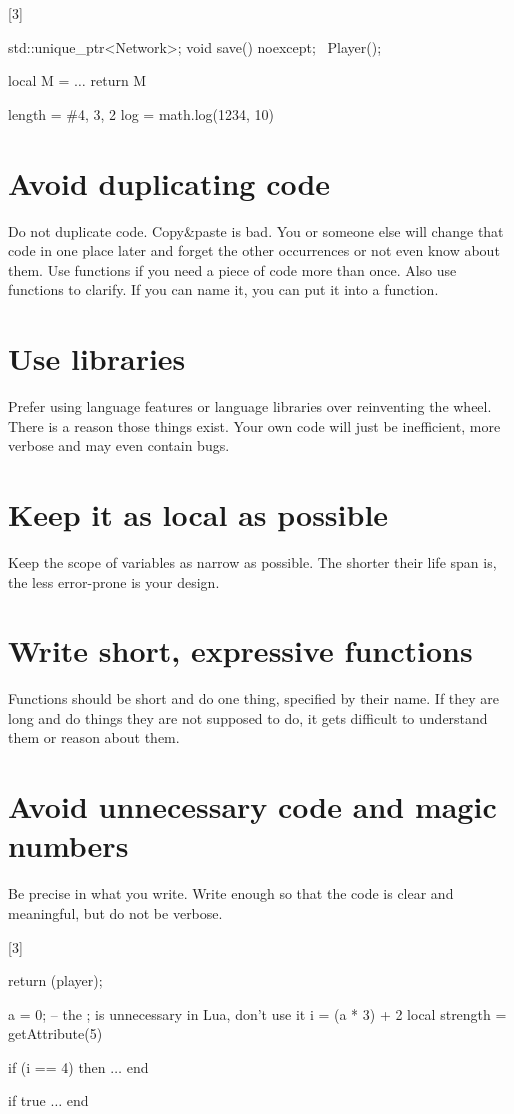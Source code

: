 \documentclass[a4paper,11pt]{scrreprt}
\newcommand{\marginMarker}[1]{%
\marginnote{%
    \hfill%
		\Huge{#1}%
}[3\baselineskip]%
}
\newcommand{\conforming}{%
\marginMarker{\textcolor{green}{\ding{51}}}%
}
\newcommand{\nonconforming}{%
\marginMarker{\textcolor{red}{\ding{55}}}%
}
\begin{document}
\conforming{}
\begin{cppBox}
std::unique_ptr<Network>;
void save() noexcept;
~Player();
\end{cppBox}
\begin{luaBox}[mathescape]
local M = {}
$\dots$
return M

length = #{4, 3, 2}
log = math.log(1234, 10)
\end{luaBox}

\section{Avoid duplicating code}
Do not duplicate code. Copy\&paste is bad. You or someone else will change that code in one place later and forget the other occurrences or not even know about them. Use functions if you need a piece of code more than once. Also use functions to clarify. If you can name it, you can put it into a function.

\section{Use libraries}
Prefer using language features or language libraries over reinventing the wheel. There is a reason those things exist. Your own code will just be inefficient, more verbose and may even contain bugs.

\section{Keep it as local as possible}
Keep the scope of variables as narrow as possible. The shorter their life span is, the less error-prone is your design.

\section{Write short, expressive functions}
Functions should be short and do one thing, specified by their name. If they are long and do things they are not supposed to do, it gets difficult to understand them or reason about them.

\section{Avoid unnecessary code and magic numbers}
Be precise in what you write. Write enough so that the code is clear and meaningful, but do not be verbose.

\nonconforming{}
\begin{cppBox}
return (player);
\end{cppBox}
\begin{luaBox}[mathescape]
a = 0; -- the ; is unnecessary in Lua, don't use it
i = (a * 3) + 2
local strength = getAttribute(5)

if (i == 4) then
    $\dots$
end

if true
    $\dots$
end
\end{luaBox}
\end{document}
